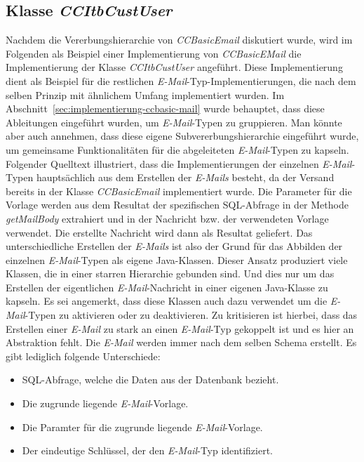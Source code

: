 \subsection{Klasse \emph{CCItbCustUser}}
Nachdem die Vererbungshierarchie von \emph{CCBasicEmail} diskutiert wurde, wird im Folgenden als Beispiel einer Implementierung von \emph{CCBasicEMail} die Implementierung der Klasse \emph{CCItbCustUser} angeführt. Diese Implementierung dient als Beispiel für die restlichen \emph{E-Mail}-Typ-Implementierungen, die nach dem selben Prinzip mit ähnlichem Umfang implementiert wurden. Im Abschnitt~\ref{sec:implementierung-ccbasic-mail} wurde behauptet, dass diese Ableitungen eingeführt wurden, um \emph{E-Mail}-Typen zu gruppieren. Man könnte aber auch annehmen, dass diese eigene Subvererbungshierarchie eingeführt wurde, um gemeinsame Funktionalitäten für die abgeleiteten \emph{E-Mail}-Typen zu kapseln. 
\newline
\newline
Folgender Quelltext illustriert, dass die Implementierungen der einzelnen \emph{E-Mail}-Typen hauptsächlich aus dem Erstellen der \emph{E-Mails} besteht, da der Versand bereits in der Klasse \emph{CCBasicEmail} implementiert wurde. Die Parameter für die Vorlage werden aus dem Resultat der spezifischen SQL-Abfrage in der Methode \emph{getMailBody} extrahiert und in der Nachricht bzw. der verwendeten Vorlage verwendet. Die erstellte Nachricht wird dann als Resultat geliefert. Das unterschiedliche Erstellen der \emph{E-Mails} ist also der Grund für das Abbilden der einzelnen \emph{E-Mail}-Typen als eigene Java-Klassen. Dieser Ansatz produziert viele Klassen, die in einer starren Hierarchie gebunden sind. Und dies nur um das Erstellen der eigentlichen \emph{E-Mail}-Nachricht in einer eigenen Java-Klasse zu kapseln. Es sei angemerkt, dass diese Klassen auch dazu verwendet um die \emph{E-Mail}-Typen zu aktivieren oder zu deaktivieren. Zu kritisieren ist hierbei, dass das Erstellen einer \emph{E-Mail} zu stark an einen \emph{E-Mail}-Typ gekoppelt ist und es hier an Abstraktion fehlt. Die \emph{E-Mail} werden immer nach dem selben Schema erstellt. Es gibt lediglich folgende Unterschiede:
\begin{itemize}
	\item SQL-Abfrage, welche die Daten aus der Datenbank bezieht.
	\item Die zugrunde liegende \emph{E-Mail}-Vorlage.
	\item Die Paramter für die zugrunde liegende \emph{E-Mail}-Vorlage.
	\item Der eindeutige Schlüssel, der den \emph{E-Mail}-Typ identifiziert.
\end{itemize}
